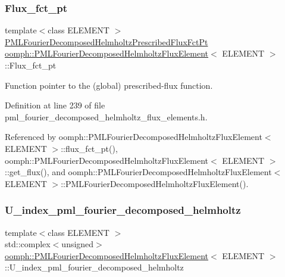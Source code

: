 \subsubsection{\texorpdfstring{Flux\+\_\+fct\+\_\+pt}{Flux\_fct\_pt}}
{\footnotesize\ttfamily template$<$class E\+L\+E\+M\+E\+NT $>$ \\
\hyperlink{classoomph_1_1PMLFourierDecomposedHelmholtzFluxElement_a21d234dc11d179dbe417b624c41e764f}{P\+M\+L\+Fourier\+Decomposed\+Helmholtz\+Prescribed\+Flux\+Fct\+Pt} \hyperlink{classoomph_1_1PMLFourierDecomposedHelmholtzFluxElement}{oomph\+::\+P\+M\+L\+Fourier\+Decomposed\+Helmholtz\+Flux\+Element}$<$ E\+L\+E\+M\+E\+NT $>$\+::Flux\+\_\+fct\+\_\+pt\hspace{0.3cm}{\ttfamily [protected]}}



Function pointer to the (global) prescribed-\/flux function. 



Definition at line 239 of file pml\+\_\+fourier\+\_\+decomposed\+\_\+helmholtz\+\_\+flux\+\_\+elements.\+h.



Referenced by oomph\+::\+P\+M\+L\+Fourier\+Decomposed\+Helmholtz\+Flux\+Element$<$ E\+L\+E\+M\+E\+N\+T $>$\+::flux\+\_\+fct\+\_\+pt(), oomph\+::\+P\+M\+L\+Fourier\+Decomposed\+Helmholtz\+Flux\+Element$<$ E\+L\+E\+M\+E\+N\+T $>$\+::get\+\_\+flux(), and oomph\+::\+P\+M\+L\+Fourier\+Decomposed\+Helmholtz\+Flux\+Element$<$ E\+L\+E\+M\+E\+N\+T $>$\+::\+P\+M\+L\+Fourier\+Decomposed\+Helmholtz\+Flux\+Element().

\mbox{\label{classoomph_1_1PMLFourierDecomposedHelmholtzFluxElement_a3fa91e9ac6bcd4483e55f74396e19f96}} 
\subsubsection{\texorpdfstring{U\+\_\+index\+\_\+pml\+\_\+fourier\+\_\+decomposed\+\_\+helmholtz}{U\_index\_pml\_fourier\_decomposed\_helmholtz}}
{\footnotesize\ttfamily template$<$class E\+L\+E\+M\+E\+NT $>$ \\
std\+::complex$<$unsigned$>$ \hyperlink{classoomph_1_1PMLFourierDecomposedHelmholtzFluxElement}{oomph\+::\+P\+M\+L\+Fourier\+Decomposed\+Helmholtz\+Flux\+Element}$<$ E\+L\+E\+M\+E\+NT $>$\+::U\+\_\+index\+\_\+pml\+\_\+fourier\+\_\+decomposed\+\_\+helmholtz\hspace{0.3cm}{\ttfamily [protected]}}



